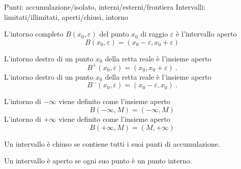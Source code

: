 Punti: accumulazione/isolato, interni/esterni/frontiera
Intervalli: limitati/illimitati, aperti/chiusi, intorno
\begin{definition} L'intorno completo $B(x_0, \varepsilon)$ del punto $x_0$ di raggio $\varepsilon$ è l'intervallo aperto
    \begin{equation}
        B(x_0, \varepsilon) = (x_0 - \varepsilon, x_0 + \varepsilon)  
    \end{equation}
\end{definition}
\begin{definition} L'intorno destro di un punto $x_0$ della retta reale è l'insieme aperto
    \begin{equation}
        B^+(x_0,\varepsilon) = (x_0, x_0+\varepsilon) \ .
    \end{equation}
L'intorno destro di un punto $x_0$ della retta reale è l'insieme aperto
    \begin{equation}
        B^-(x_0,\varepsilon) = (x_0-\varepsilon, x_0) \ .
    \end{equation}
\end{definition}
\begin{definition}
L'intorno di $-\infty$ viene definito come l'insieme aperto
    \begin{equation}
        B(-\infty,M) = (-\infty,M)
    \end{equation}
L'intorno di $+\infty$ viene definito come l'insieme aperto
    \begin{equation}
        B(+\infty,M) = (M,+\infty)
    \end{equation}
\end{definition}

\begin{definition} 
\end{definition}
\begin{definition}
\end{definition}

\begin{definition} {\color{red} Un intervallo è chiuso se contiene tutti i suoi punti di accumulazione.}
\end{definition}
\begin{definition} {\color{red} Un intervallo è aperto se ogni suo punto è un punto interno.}
\end{definition}

